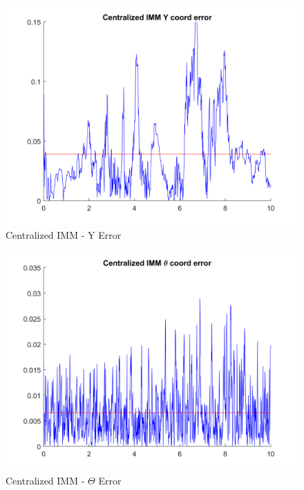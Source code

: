 \documentclass[conference]{IEEEtran}
\begin{document}
\begin{figure}[H]
 \includegraphics[width=\linewidth]{dwg/CIMM-y-error.png}
  \caption{Centralized IMM - Y Error}
 
\end{figure}

\begin{figure}[H]
 \includegraphics[width=\linewidth]{dwg/CIMM-t-error.png}
  \caption{Centralized IMM - $\Theta$ Error}
 
\end{figure}
\end{document}

